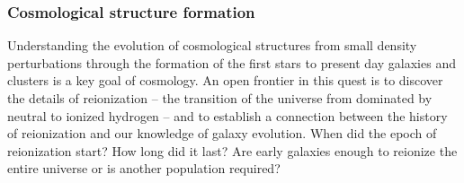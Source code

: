 
\vspace{-0.18in}

\subsubsection{Cosmological structure formation}

\vspace{-0.05in}

Understanding the evolution of cosmological structures from small density perturbations through the formation of the
first stars to present day galaxies and clusters is a key goal of cosmology. An open frontier in this quest is  
to discover the details of reionization -- the transition of the universe from dominated by neutral to ionized 
hydrogen -- and to establish a connection between the history of reionization and our knowledge of galaxy evolution. 
When did the epoch of reionization start?  How long did it last? Are early galaxies enough to reionize the entire 
universe or is another population required?


 
